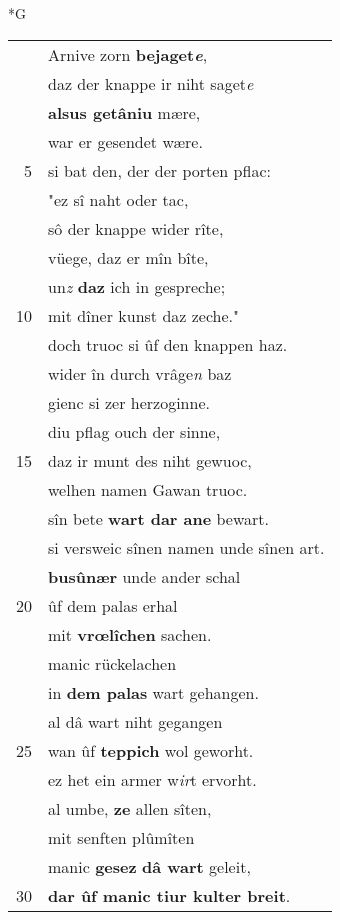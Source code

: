 \documentclass[8pt,a4paper,notitlepage]{article}
\begin{document}
\begin{table}[ht]
\begin{minipage}[t]{0.5\linewidth}
\small
\begin{center}*G
\end{center}
\begin{tabular}{rl}
 & Arnive zorn \textbf{bejaget\textit{e}},\\ 
 & daz der knappe ir niht saget\textit{e}\\ 
 & \textbf{alsus getâniu} mære,\\ 
 & war er gesendet wære.\\ 
5 & si bat den, der der porten pflac:\\ 
 & "ez sî naht oder tac,\\ 
 & sô der knappe wider rîte,\\ 
 & vüege, daz er mîn bîte,\\ 
 & un\textit{z} \textbf{daz} ich in gespreche;\\ 
10 & mit dîner kunst daz zeche."\\ 
 & doch truoc si ûf den knappen haz.\\ 
 & wider în durch vrâge\textit{n} baz\\ 
 & gienc si zer herzoginne.\\ 
 & diu pflag ouch der sinne,\\ 
15 & daz ir munt des niht gewuoc,\\ 
 & welhen namen Gawan truoc.\\ 
 & sîn bete \textbf{wart dar ane} bewart.\\ 
 & si versweic sînen namen unde sînen art.\\ 
 & \textbf{busûnær} unde ander schal\\ 
20 & ûf dem palas erhal\\ 
 & mit \textbf{vrœlîchen} sachen.\\ 
 & manic rückelachen\\ 
 & in \textbf{dem palas} wart gehangen.\\ 
 & al dâ wart niht gegangen\\ 
25 & wan ûf \textbf{teppich} wol geworht.\\ 
 & ez het ein armer w\textit{ir}t ervorht.\\ 
 & al umbe, \textbf{ze} allen sîten,\\ 
 & mit senften plûmîten\\ 
 & manic \textbf{gesez} \textbf{dâ wart} geleit,\\ 
30 & \textbf{dar ûf manic tiur kulter breit}.\\ 

\end{tabular}
\end{minipage}
\end{table}
\end{document}

